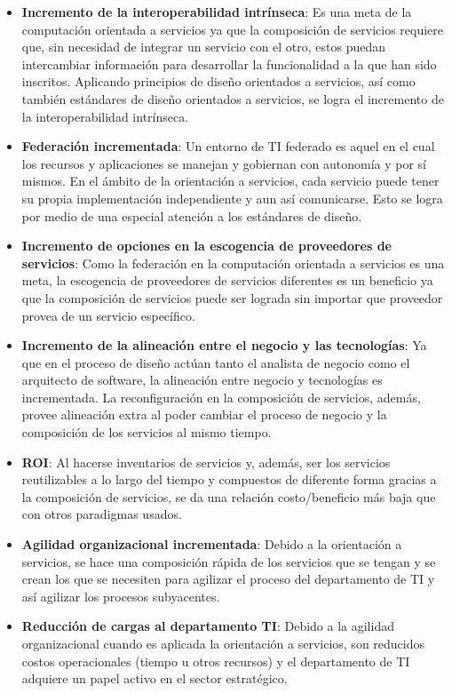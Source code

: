 \begin{itemize}
  \item \textbf{Incremento de la interoperabilidad intrínseca}: Es una meta de la computación orientada a servicios ya que la composición de servicios requiere que, sin necesidad de integrar un servicio con el otro, estos puedan intercambiar información para desarrollar la funcionalidad a la que han sido inscritos. Aplicando principios de diseño orientados a servicios, así como también estándares de diseño orientados a servicios, se logra el incremento de la interoperabilidad intrínseca.
  \item \textbf{Federación incrementada}: Un entorno de TI federado es aquel en el cual los recursos y aplicaciones se manejan y gobiernan con autonomía y por sí mismos. En el ámbito de la orientación a servicios, cada servicio puede tener su propia implementación independiente y aun así comunicarse. Esto se logra por medio de una especial atención a los estándares de diseño.
  \item \textbf{Incremento de opciones en la escogencia de proveedores de servicios}: Como la federación en la computación orientada a servicios es una meta, la escogencia de proveedores de servicios diferentes es un beneficio ya que la composición de servicios puede ser lograda sin importar que proveedor provea de un servicio específico.
  \item \textbf{Incremento de la alineación entre el negocio y las tecnologías}: Ya que en el proceso de diseño actúan tanto el analista de negocio como el arquitecto de software, la alineación entre negocio y tecnologías es incrementada. La reconfiguración en la composición de servicios, además, provee alineación extra al poder cambiar el proceso de negocio y la composición de los servicios al mismo tiempo.
  \item \textbf{ROI}: Al hacerse inventarios de servicios y, además, ser los servicios reutilizables a lo largo del tiempo y compuestos de diferente forma gracias a la composición de servicios, se da una relación costo/beneficio más baja que con otros paradigmas usados.
  \item \textbf{Agilidad organizacional incrementada}: Debido a la orientación a servicios, se hace una composición rápida de los servicios que se tengan y se crean los que se necesiten para agilizar el proceso del departamento de TI y así agilizar los procesos subyacentes.
  \item \textbf{Reducción de cargas al departamento TI}: Debido a la agilidad organizacional cuando es aplicada la orientación a servicios, son reducidos costos operacionales (tiempo u otros recursos) y el departamento de TI adquiere un papel activo en el sector estratégico.
\end{itemize}
